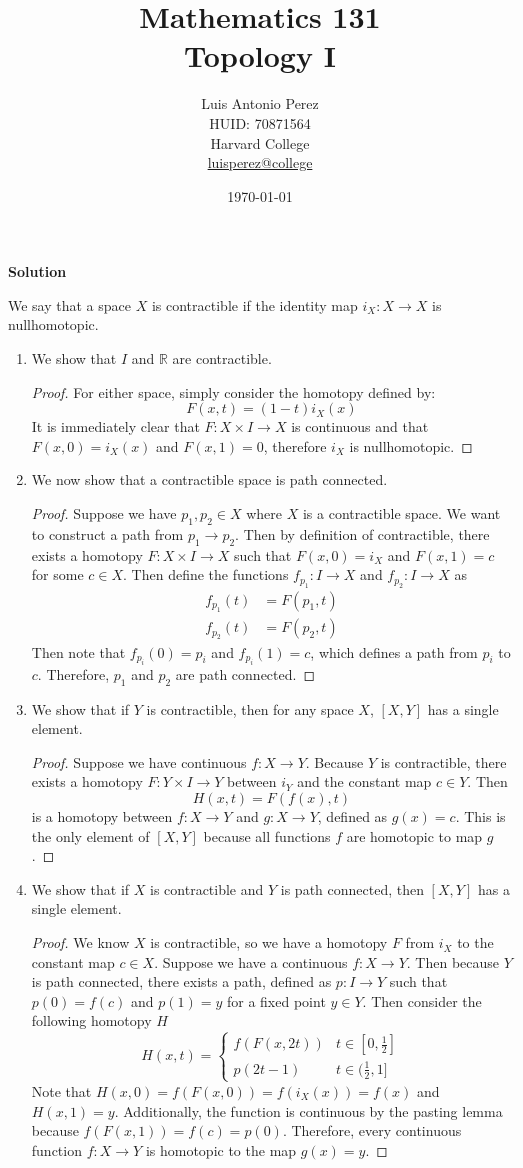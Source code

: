 \documentclass[12pt]{article}
\title{Mathematics 131 \\
Topology I}
\author{
        Luis Antonio Perez \\
        HUID: 70871564 \\
        Harvard College \\
        \href{mailto:luisperez@college.harvard.edu}{luisperez@college}
}
\date{\today}
\newcounter{AnswerCounter}
\newcounter{SubAnswerCounter}
\newenvironment{answer}[0]{
  \setcounter{SubAnswerCounter}{1}
  \bigskip
  \textbf{Solution \arabic{AnswerCounter}}
  \\
  \begin{small}
}{
  \end{small}
  \stepcounter{AnswerCounter}
}
\begin{document}
\begin{answer}[Page 330, \#3]
We say that a space $X$ is contractible if the identity map $i_X: X \to X$ is nullhomotopic.
\begin{enumerate}
\item We show that $I$ and $\mathbb{R}$ are contractible.
\begin{proof}
For either space, simply consider the homotopy defined by:
$$
F(x,t) = (1-t)i_X(x)
$$
It is immediately clear that $F: X \times I \to X$ is continuous and that $F(x,0) = i_X(x)$ and $F(x,1) = 0$, therefore $i_X$ is nullhomotopic.
\end{proof}
\item We now show that a contractible space is path connected.
\begin{proof}
Suppose we have $p_1,p_2 \in X$ where $X$ is a contractible space. We want to construct a path from $p_1 \to p_2$. Then by definition of contractible, there exists a homotopy $F: X \times I \to X$ such that $F(x,0) = i_X$ and $F(x,1) = c$ for some $c \in X$. Then define the functions $f_{p_1}: I \to X$ and $f_{p_2}: I \to X$ as
\begin{align*}
f_{p_1}(t) &= F(p_1,t) \\
f_{p_2}(t) &= F(p_2,t)
\end{align*}
Then note that $f_{p_i}(0) = p_i$ and $f_{p_i}(1) = c$, which defines a path from $p_i$ to $c$. Therefore, $p_1$ and $p_2$ are path connected.
\end{proof}
\item We show that if $Y$ is contractible, then for any space $X$, $[X,Y]$ has a single element.
\begin{proof}
Suppose we have continuous $f: X \to Y$. Because $Y$ is contractible, there exists a homotopy $F: Y \times I \to Y$ between $i_Y$ and the constant map $c \in Y$. Then
$$
H(x,t) = F(f(x),t)
$$
is a homotopy between $f: X \to Y$ and $g: X \to Y$, defined as $g(x) = c$. This is the only element of $[X,Y]$ because all functions $f$ are homotopic to map $g$.
\end{proof}
\item We show that if $X$ is contractible and $Y$ is path connected, then $[X,Y]$ has a single element.
\begin{proof}
We know $X$ is contractible, so we have a homotopy $F$ from $i_X$ to the constant map $c \in X$. Suppose we have a continuous $f: X \to Y$. Then because $Y$ is path connected, there exists a path, defined as $p: I \to Y$ such that $p(0) = f(c)$ and $p(1) = y$ for a fixed point $y \in Y$. Then consider the following homotopy $H$
$$
H(x,t) =
\begin{cases}
f(F(x,2t)) & t \in [0,\frac{1}{2}] \\
p(2t - 1) & t \in (\frac{1}{2}, 1]
\end{cases}
$$
Note that $H(x,0) = f(F(x,0)) = f(i_X(x)) = f(x)$ and $H(x,1) = y$. Additionally, the function is continuous by the pasting lemma because $f(F(x,1)) = f(c) = p(0)$. Therefore, every continuous function $f: X \to Y$ is homotopic to the map $g(x) = y$.
\end{proof}
\end{enumerate}
\end{answer}
\end{document}
